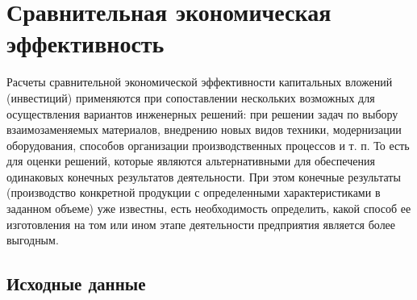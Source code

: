 







\section{Сравнительная экономическая эффективность}

Расчеты сравнительной экономической эффективности капитальных вложений (инвестиций) применяются при сопоставлении нескольких возможных для осуществления вариантов инженерных решений: при решении задач по выбору взаимозаменяемых материалов, внедрению новых видов техники, модернизации оборудования, способов организации производственных процессов и т. п. То есть для оценки решений, которые являются альтернативными для обеспечения одинаковых конечных результатов деятельности. При этом конечные результаты (производство конкретной продукции с определенными характеристиками в заданном объеме) уже известны, есть необходимость определить, какой способ ее изготовления на том или ином этапе деятельности предприятия является более выгодным.

\subsection{Исходные данные}

